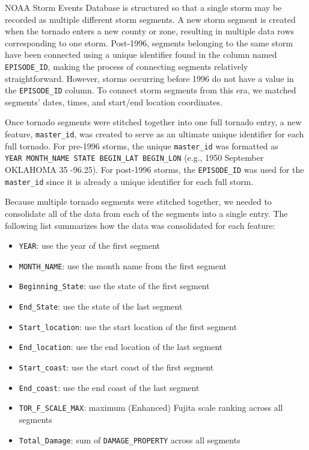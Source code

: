 \documentclass[
  letterpaper,
  DIV=11,
  numbers=noendperiod]{scrreprt}
\providecommand{\tightlist}{%
  \setlength{\itemsep}{0pt}\setlength{\parskip}{0pt}}
\begin{document}
NOAA Storm Events Database is structured so that a single storm may be
recorded as multiple different storm segments. A new storm segment is
created when the tornado enters a new county or zone, resulting in
multiple data rows corresponding to one storm. Post-1996, segments
belonging to the same storm have been connected using a unique
identifier found in the column named \texttt{EPISODE\_ID}, making the
process of connecting segments relatively straightforward. However,
storms occurring before 1996 do not have a value in the
\texttt{EPISODE\_ID} column. To connect storm segments from this era, we
matched segments' dates, times, and start/end location coordinates.

Once tornado segments were stitched together into one full tornado
entry, a new feature, \texttt{master\_id}, was created to serve as an
ultimate unique identifier for each full tornado. For pre-1996 storms,
the unique \texttt{master\_id} was formatted as
\texttt{YEAR\ MONTH\_NAME\ STATE\ BEGIN\_LAT\ BEGIN\_LON} (e.g., 1950
September OKLAHOMA 35 -96.25). For post-1996 storms, the
\texttt{EPISODE\_ID} was used for the \texttt{master\_id} since it is
already a unique identifier for each full storm.

Because multiple tornado segments were stitched together, we needed to
consolidate all of the data from each of the segments into a single
entry. The following list summarizes how the data was consolidated for
each feature:

\begin{itemize}
\tightlist
\item
  \texttt{YEAR}: use the year of the first segment
\item
  \texttt{MONTH\_NAME}: use the month name from the first segment
\item
  \texttt{Beginning\_State}: use the state of the first segment
\item
  \texttt{End\_State}: use the state of the last segment
\item
  \texttt{Start\_location}: use the start location of the first segment
\item
  \texttt{End\_location}: use the end location of the last segment
\item
  \texttt{Start\_coast}: use the start coast of the first segment
\item
  \texttt{End\_coast}: use the end coast of the last segment
\item
  \texttt{TOR\_F\_SCALE\_MAX}: maximum (Enhanced) Fujita scale ranking
  across all segments
\item
  \texttt{Total\_Damage}: sum of \texttt{DAMAGE\_PROPERTY} across all
  segments
\end{itemize}
\end{document}
